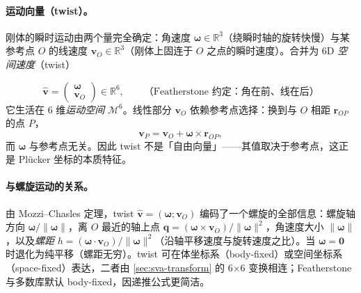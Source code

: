 \paragraph{运动向量（twist）。}
刚体的瞬时运动由两个量完全确定：角速度 $\boldsymbol\omega\in\mathbb R^3$（绕瞬时轴的旋转快慢）与某参考点 $O$ 的线速度 $\mathbf v_O\in\mathbb R^3$（刚体上固连于 $O$ 之点的瞬时速度）。合并为 6D \emph{空间速度}（twist）

\begin{equation}
  \hat{\mathbf v}=\begin{pmatrix}\boldsymbol\omega\\ \mathbf v_O\end{pmatrix}\in\mathbb R^6,
  \qquad\text{（Featherstone 约定：角在前、线在后）}
  \label{eq:sva-twist}
\end{equation}
它生活在 6 维\emph{运动空间} $\mathcal M^6$。线性部分 $\mathbf v_O$ 依赖参考点选择：换到与 $O$ 相距 $\mathbf r_{OP}$ 的点 $P$，
\begin{equation}
  \mathbf v_P=\mathbf v_O+\boldsymbol\omega\times\mathbf r_{OP},
  \label{eq:sva-vref}
\end{equation}
而 $\boldsymbol\omega$ 与参考点无关。因此 twist 不是「自由向量」——其值取决于参考点，这正是 Plücker 坐标的本质特征。

\paragraph{与螺旋运动的关系。}
由 Mozzi--Chasles 定理，twist $\hat{\mathbf v}=(\boldsymbol\omega;\mathbf v_O)$ 编码了一个螺旋的全部信息：螺旋轴方向 $\boldsymbol\omega/\|\boldsymbol\omega\|$，离 $O$ 最近的轴上点 $\mathbf q=(\boldsymbol\omega\times\mathbf v_O)/\|\boldsymbol\omega\|^2$，角速度大小 $\|\boldsymbol\omega\|$，以及\emph{螺距} $h=(\boldsymbol\omega\cdot\mathbf v_O)/\|\boldsymbol\omega\|^2$（沿轴平移速度与旋转速度之比）。当 $\boldsymbol\omega=\mathbf 0$ 时退化为纯平移（螺距无穷）。twist 可在体坐标系（body-fixed）或空间坐标系（space-fixed）表达，二者由 \cref{sec:sva-transform} 的 6×6 变换相连；Featherstone 与多数库默认 body-fixed，因递推公式更简洁。

